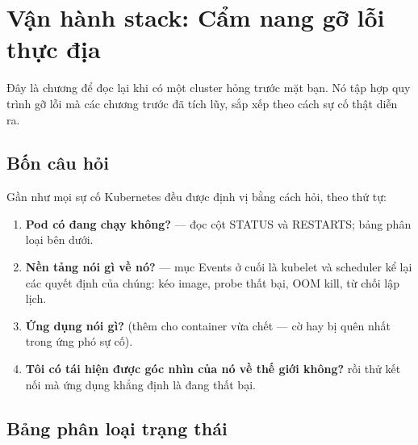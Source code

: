 \chapter{Vận hành stack: Cẩm nang gỡ lỗi thực địa}
\label{ch:operations}

Đây là chương để đọc lại khi có một cluster hỏng trước mặt bạn. Nó
tập hợp quy trình gỡ lỗi mà các chương trước đã tích lũy, sắp xếp
theo cách sự cố thật diễn ra.

\section{Bốn câu hỏi}

Gần như mọi sự cố Kubernetes đều được định vị bằng cách hỏi, theo thứ
tự:

\begin{enumerate}
  \item \textbf{Pod có đang chạy không?} 
  --- đọc cột STATUS và RESTARTS; bảng phân loại bên dưới.
  \item \textbf{Nền tảng nói gì về nó?}
   --- mục Events ở cuối là
  kubelet và scheduler kể lại các quyết định của chúng: kéo image,
  probe thất bại, OOM kill, từ chối lập lịch.
  \item \textbf{Ứng dụng nói gì?}  (thêm  cho container vừa chết --- cờ hay bị
  quên nhất trong ứng phó sự cố).
  \item \textbf{Tôi có tái hiện được góc nhìn của nó về thế giới
  không?}  rồi thử kết nối
  mà ứng dụng khẳng định là đang thất bại.
\end{enumerate}

\section{Bảng phân loại trạng thái}

